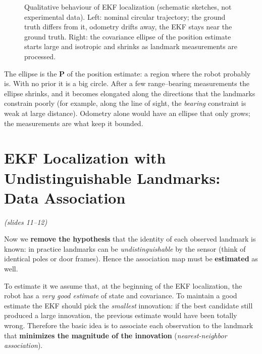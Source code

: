\documentclass[11pt,a4paper]{article}
\theoremstyle{definition}
\theoremstyle{plain}
\theoremstyle{remark}
\newcommand{\slides}[1]{\par\vspace{-2pt}\noindent\emph{(slides #1)}\par\smallskip}
\newcommand{\robot}[3][fill=white]{\begin{scope}[shift={(#2)},rotate=#3]\draw[#1,thick] (0.24,0)--(-0.16,0.15)--(-0.16,-0.15)--cycle;\end{scope}}
\begin{document}
\begin{figure}[H]
\begin{minipage}[t]{0.48\linewidth}
\end{minipage}
\caption{Qualitative behaviour of EKF localization (schematic sketches, not experimental data). Left: nominal circular trajectory; the ground truth differs from it, odometry drifts away, the EKF stays near the ground truth. Right: the covariance ellipse of the position estimate starts large and isotropic and shrinks as landmark measurements are processed.}
\label{fig:typical1}
\end{figure}

\begin{intuition}
The ellipse is the $\bm P$ of the position estimate: a region where the robot probably is. With no prior it is a big circle. After a few range--bearing measurements the ellipse shrinks, and it becomes elongated along the directions that the landmarks constrain poorly (for example, along the line of sight, the \emph{bearing} constraint is weak at large distance). Odometry alone would have an ellipse that only grows; the measurements are what keep it bounded.
\end{intuition}

\section{EKF Localization with Undistinguishable Landmarks: Data Association}
\label{sec:assoc}
\slides{11--12}

Now we \textbf{remove the hypothesis} that the identity of each observed landmark is known: in practice landmarks can be \emph{undistinguishable} by the sensor (think of identical poles or door frames). Hence the association map must be \textbf{estimated} as well.

To estimate it we assume that, at the beginning of the EKF localization, the robot has a \emph{very good estimate} of state and covariance. To maintain a good estimate the EKF should pick the \emph{smallest} innovation: if the best candidate still produced a large innovation, the previous estimate would have been totally wrong. Therefore the basic idea is to associate each observation to the landmark that \textbf{minimizes the magnitude of the innovation} (\emph{nearest-neighbor association}).
\end{document}
